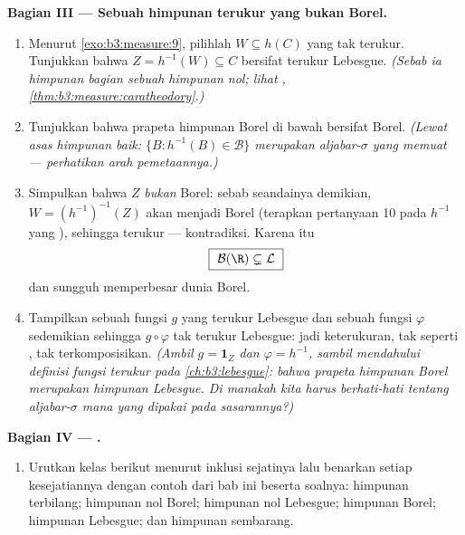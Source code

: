 \begin{problem}
\medskip
\noindent\textbf{Bagian III --- Sebuah himpunan terukur yang bukan
Borel.}
\begin{enumerate}[resume]
  \item Menurut \cref{exo:b3:measure:9}, pilihlah $W
        \subseteq h(C)$ yang tak terukur. Tunjukkan bahwa $Z = h^{-1}(W) \subseteq C$
        bersifat terukur Lebesgue. \emph{(Sebab ia himpunan bagian sebuah himpunan
        nol; lihat , \cref{thm:b3:measure:caratheodory}.)}
  \item Tunjukkan bahwa prapeta himpunan Borel di bawah  bersifat Borel. \emph{(Lewat asas himpunan baik:
        $\{B : h^{-1}(B) \in \mathcal B\}$ merupakan
        aljabar-$\sigma$ yang memuat  --- perhatikan
        arah pemetaannya.)}
  \item Simpulkan bahwa $Z$ \emph{bukan} Borel: sebab seandainya demikian,
        $W = (h^{-1})^{-1}(Z)$ akan menjadi Borel (terapkan pertanyaan
        10 pada $h^{-1}$ yang ), sehingga terukur ---
        kontradiksi. Karena itu
        \[
        \boxed{\ \mathcal B(\R) \subsetneq \mathcal L\ }
        \]
        dan  sungguh memperbesar dunia Borel.
  \item Tampilkan sebuah fungsi $g$ yang terukur Lebesgue dan sebuah
        fungsi  $\varphi$ sedemikian sehingga $g \circ
        \varphi$ tak terukur Lebesgue: jadi keterukuran,
        tak seperti , tak terkomposisikan. \emph{(Ambil $g =
        \mathbf 1_Z$ dan $\varphi = h^{-1}$, sambil mendahului
        definisi fungsi terukur pada
        \cref{ch:b3:lebesgue}: bahwa prapeta himpunan Borel merupakan
        himpunan Lebesgue. Di manakah kita harus berhati-hati tentang
        aljabar-$\sigma$ mana yang dipakai pada sasarannya?)}
\end{enumerate}

\medskip
\noindent\textbf{Bagian IV --- .}
\begin{enumerate}[resume]
  \item Urutkan kelas berikut menurut inklusi sejatinya lalu
        benarkan setiap kesejatiannya dengan contoh dari bab
        ini beserta soalnya: himpunan terbilang; himpunan nol
        Borel; himpunan nol Lebesgue; himpunan Borel; himpunan Lebesgue;
        dan himpunan sembarang.
\end{enumerate}


\end{problem}
